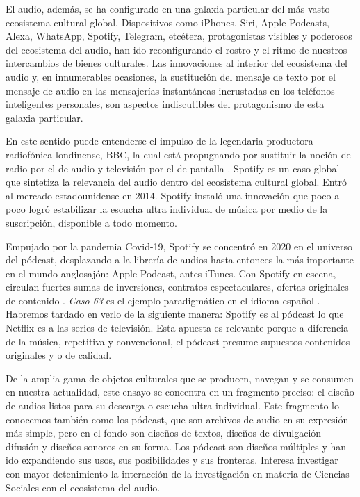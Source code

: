 \documentclass[
  spanish,
  11pt,
  a4paper,
]{scrbook}
\begin{document}
El audio, además, se ha configurado en una galaxia particular del más
vasto ecosistema cultural global. Dispositivos como iPhones, Siri, Apple
Podcasts, Alexa, WhatsApp, Spotify, Telegram, etcétera, protagonistas
visibles y poderosos del ecosistema del audio, han ido reconfigurando el
rostro y el ritmo de nuestros intercambios de bienes culturales. Las
innovaciones al interior del ecosistema del audio y, en innumerables
ocasiones, la sustitución del mensaje de texto por el mensaje de audio
en las mensajerías instantáneas incrustadas en los teléfonos
inteligentes personales, son aspectos indiscutibles del protagonismo de
esta galaxia particular.

En este sentido puede entenderse el impulso de la legendaria productora
radiofónica londinense, BBC, la cual está propugnando por sustituir la
noción de radio por el de audio y televisión por el de pantalla
\autocite{EspinosadelosMonteros2021}. Spotify es un caso global que
sintetiza la relevancia del audio dentro del ecosistema cultural global.
Entró al mercado estadounidense en 2014. Spotify instaló una innovación
que poco a poco logró estabilizar la escucha ultra individual de música
por medio de la suscripción, disponible a todo momento.

Empujado por la pandemia Covid-19, Spotify se concentró en 2020 en el
universo del pódcast, desplazando a la librería de audios hasta entonces
la más importante en el mundo anglosajón: Apple Podcast, antes iTunes.
Con Spotify en escena, circulan fuertes sumas de inversiones, contratos
espectaculares, ofertas originales de contenido
\autocite{Leijonhufvud2021}. \emph{Caso 63} es el ejemplo paradigmático
en el idioma español \autocite{StudiosSpotify2020,BeltranNieves2024}.
Habremos tardado en verlo de la siguiente manera: Spotify es al pódcast
lo que Netflix es a las series de televisión. Esta apuesta es relevante
porque a diferencia de la música, repetitiva y convencional, el pódcast
presume supuestos contenidos originales y o de calidad.

De la amplia gama de objetos culturales que se producen, navegan y se
consumen en nuestra actualidad, este ensayo se concentra en un fragmento
preciso: el diseño de audios listos para su descarga o escucha
ultra-individual. Este fragmento lo conocemos también como los pódcast,
que son archivos de audio en su expresión más simple, pero en el fondo
son diseños de textos, diseños de divulgación-difusión y diseños sonoros
en su forma. Los pódcast son diseños múltiples y han ido expandiendo sus
usos, sus posibilidades y sus fronteras. Interesa investigar con mayor
detenimiento la interacción de la investigación en materia de Ciencias
Sociales con el ecosistema del audio.
\end{document}
